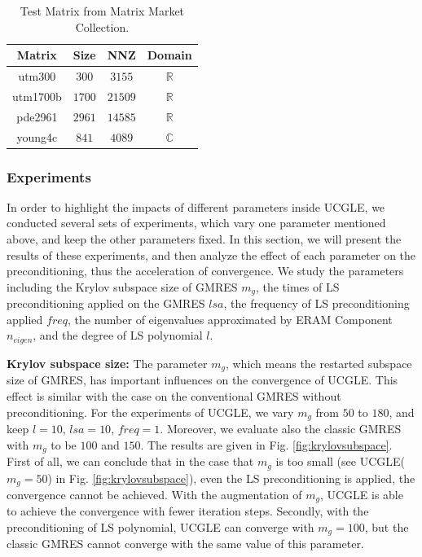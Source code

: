 \begin{table}[htbp]
	\renewcommand{\arraystretch}{1.4}
	\small	
	\caption{Test Matrix from Matrix Market Collection.}
	\label{testmatrixforparameters}
	\centering
	\begin{tabular}{c|c|c|c}
		\toprule
			\cellcolor{gray!50}Matrix  & 	\cellcolor{gray!50}Size & 	\cellcolor{gray!50}NNZ & 	\cellcolor{gray!50}Domain\\
		\midrule
		utm300  & $300$ & $3155$ &$\mathbb{R}$ \\
			\cellcolor{gray!20}utm1700b & 	\cellcolor{gray!20}$1700$ & 	\cellcolor{gray!20}$21509$  & 	\cellcolor{gray!20}$\mathbb{R}$ \\
		pde2961 & $2961$ & $14585$& $\mathbb{R}$ \\
			\cellcolor{gray!20}young4c & 	\cellcolor{gray!20}$841$ & 	\cellcolor{gray!20}$4089$& 	\cellcolor{gray!20}$\mathbb{C}$ \\
		\bottomrule
	\end{tabular}
\label{table:matrixmarket}
\end{table}

\subsubsection{Experiments}

In order to highlight the impacts of different parameters inside UCGLE, we conducted several sets of experiments, which vary one parameter mentioned above, and keep the other parameters fixed. In this section, we will present the results of these experiments, and then analyze the effect of each parameter on the preconditioning, thus the acceleration of convergence. We study the parameters including the Krylov subspace size of GMRES $m_g$, the times of LS preconditioning applied on the GMRES $lsa$, the frequency of LS preconditioning applied $freq$, the number of eigenvalues approximated by ERAM Component $n_{eigen}$, and the degree of LS polynomial $l$.

\textbf{Krylov subspace size: }The parameter $m_g$, which means the restarted subspace size of GMRES, has important influences on the convergence of UCGLE.  This effect is similar with the case on the conventional GMRES without preconditioning. For the experiments of UCGLE, we vary $m_g$ from $50$ to $180$, and keep $l=10$, $lsa=10$, $freq=1$. Moreover, we evaluate also the classic GMRES with $m_g$ to be $100$ and $150$. The results are given in Fig. \ref{fig:krylovsubspace}. First of all, we can conclude that in the case that $m_g$ is too small (see UCGLE($m_g=50$) in  Fig. \ref{fig:krylovsubspace}), even the LS preconditioning is applied, the convergence cannot be achieved. With the augmentation of $m_g$, UCGLE is able to achieve the convergence with fewer iteration steps. Secondly, with the preconditioning of LS polynomial, UCGLE can converge with $m_g=100$, but the classic GMRES cannot converge with the same value of this parameter.

